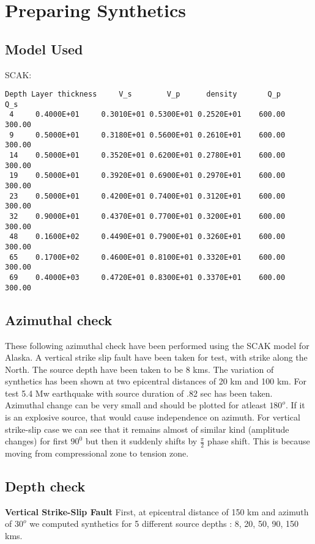 \documentclass[11pt,titlepage,fleqn]{article}
\begin{document}
\pagebreak
\section{Preparing Synthetics}
\subsection{Model Used}
SCAK:
\begin{verbatim}
Depth Layer thickness     V_s        V_p      density       Q_p       Q_s
 4     0.4000E+01     0.3010E+01 0.5300E+01 0.2520E+01    600.00    300.00
 9     0.5000E+01     0.3180E+01 0.5600E+01 0.2610E+01    600.00    300.00
 14    0.5000E+01     0.3520E+01 0.6200E+01 0.2780E+01    600.00    300.00
 19    0.5000E+01     0.3920E+01 0.6900E+01 0.2970E+01    600.00    300.00
 23    0.5000E+01     0.4200E+01 0.7400E+01 0.3120E+01    600.00    300.00
 32    0.9000E+01     0.4370E+01 0.7700E+01 0.3200E+01    600.00    300.00
 48    0.1600E+02     0.4490E+01 0.7900E+01 0.3260E+01    600.00    300.00
 65    0.1700E+02     0.4600E+01 0.8100E+01 0.3320E+01    600.00    300.00
 69    0.4000E+03     0.4720E+01 0.8300E+01 0.3370E+01    600.00    300.00
\end{verbatim}

\subsection{Azimuthal check}
These following azimuthal check have been performed using the SCAK model for Alaska. A vertical strike slip fault have been taken for test, with strike along the North. The source depth have been taken to be 8 kms. The variation of synthetics has been shown at two epicentral distances of 20 km and 100 km. For test 5.4 Mw earthquake with source duration of .82 sec has been taken.
Azimuthal change can be very small and should be plotted for atleast $180^o$. If it is an explosive source, that would cause independence on azimuth. For vertical strike-slip case we can see that it remains almost of similar kind (amplitude changes) for first $90^0$ but then it suddenly shifts by $\frac{\pi}{2}$ phase shift. This is because moving from compressional zone to tension zone.

\subsection{Depth check}
{\bf Vertical Strike-Slip Fault}
First, at epicentral distance of 150 km and azimuth of $30^o$ we computed synthetics for 5 different source depths : 8, 20, 50, 90, 150 kms.
\end{document}
